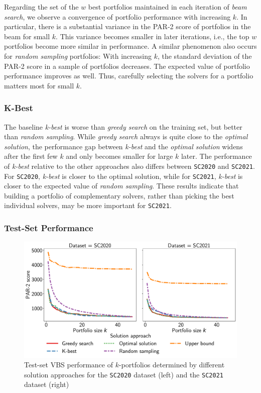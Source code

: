 \documentclass[a4paper,USenglish,pdfa]{lipics-v2021} %
\begin{document}
Regarding the set of the $w$ best portfolios maintained in each iteration of \emph{beam search}, we observe a convergence of portfolio performance with increasing $k$. 
In particular, there is a substantial variance in the PAR-2 score of portfolios in the beam for small $k$.
This variance becomes smaller in later iterations, i.e., the top $w$ portfolios become more similar in performance.
A similar phenomenon also occurs for \emph{random sampling} portfolios:
With increasing $k$, the standard deviation of the PAR-2 score in a sample of portfolios decreases.
The expected value of portfolio performance improves as well.
Thus, carefully selecting the solvers for a portfolio matters most for small $k$.

\subsubsection{K-Best}

The baseline \emph{k-best} is worse than \emph{greedy search} on the training set, but better than \emph{random sampling}.
While \emph{greedy search} always is quite close to the \emph{optimal solution}, the performance gap between \emph{k-best} and the \emph{optimal solution} widens after the first few $k$ and only becomes smaller for large $k$ later.
The performance of \emph{k-best} relative to the other approaches also differs between \texttt{SC2020} and \texttt{SC2021}.
For \texttt{SC2020}, \emph{k-best} is closer to the optimal solution, while for \texttt{SC2021}, \emph{k-best} is closer to the expected value of \emph{random sampling}.
These results indicate that building a portfolio of complementary solvers, rather than picking the best individual solvers, may be more important for \texttt{SC2021}. 

\subsubsection{Test-Set Performance}

\begin{figure}[htb]
	\centering
	\includegraphics[width=\columnwidth]{plots/search-test-objective.pdf}
	\caption{Test-set VBS performance of $k$-portfolios determined by different solution approaches for the \texttt{SC2020} dataset (left) and the \texttt{SC2021} dataset (right)}
	\label{fig:search-test-objective}
\end{figure}
\end{document}
